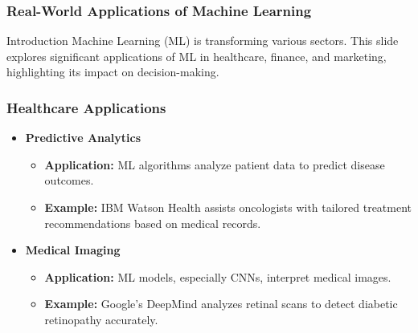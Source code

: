 \documentclass[aspectratio=169]{beamer}
\begin{document}
\begin{frame}[fragile]
    \frametitle{Real-World Applications of Machine Learning}
    \begin{block}{Introduction}
        Machine Learning (ML) is transforming various sectors. This slide explores significant applications of ML in healthcare, finance, and marketing, highlighting its impact on decision-making.
    \end{block}
\end{frame}

\begin{frame}[fragile]
    \frametitle{Healthcare Applications}
    \begin{itemize}
        \item \textbf{Predictive Analytics}
            \begin{itemize}
                \item \textbf{Application:} ML algorithms analyze patient data to predict disease outcomes.
                \item \textbf{Example:} IBM Watson Health assists oncologists with tailored treatment recommendations based on medical records.
            \end{itemize}

        \item \textbf{Medical Imaging}
            \begin{itemize}
                \item \textbf{Application:} ML models, especially CNNs, interpret medical images.
                \item \textbf{Example:} Google’s DeepMind analyzes retinal scans to detect diabetic retinopathy accurately.
            \end{itemize}
    \end{itemize}
\end{frame}
\end{document}
